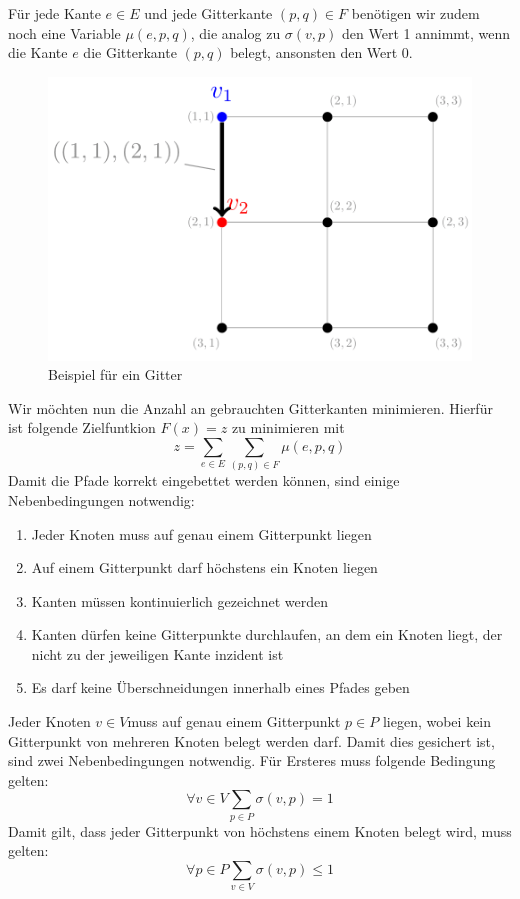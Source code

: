 \documentclass[bachelor, german]{algothesis}
\begin{document}
Für jede Kante $e \in E$ und jede Gitterkante $(p,q) \in F$ benötigen wir zudem noch eine Variable $\mu(e,p,q)$, die analog zu $\sigma(v,p)$ den Wert 1 annimmt, wenn die Kante $e$ die Gitterkante $(p,q)$ belegt, ansonsten den Wert 0.\newline
\begin{figure}[H]
    \centering
    \includegraphics{figures/Variabelsetzung.png}
    \caption{Beispiel für ein Gitter}
    \label{fig:Var_Example}
\end{figure}
Wir möchten nun die Anzahl an gebrauchten Gitterkanten minimieren. Hierfür ist folgende Zielfuntkion $F(x) = z$  zu minimieren mit $$z = \sum_{e \in E} \sum_{(p,q) \in F} \mu(e,p,q)$$
Damit die Pfade korrekt eingebettet werden können, sind einige Nebenbedingungen notwendig:
\begin{enumerate}[(1)]
    \item Jeder Knoten muss auf genau einem Gitterpunkt liegen
    \item Auf einem Gitterpunkt darf höchstens ein Knoten liegen
    \item Kanten müssen kontinuierlich gezeichnet werden
    \item Kanten dürfen keine Gitterpunkte durchlaufen, an dem ein Knoten liegt, der nicht zu der jeweiligen Kante inzident ist
    \item Es darf keine Überschneidungen innerhalb eines Pfades geben
\end{enumerate}
Jeder Knoten $v \in V$muss auf genau einem Gitterpunkt $p \in P$ liegen, wobei kein Gitterpunkt von mehreren Knoten belegt werden darf. Damit dies gesichert ist, sind zwei Nebenbedingungen notwendig. Für Ersteres muss folgende Bedingung gelten: $$ \forall v \in V \sum_{p \in P} \sigma(v,p) = 1$$ Damit gilt, dass jeder Gitterpunkt von höchstens einem Knoten belegt wird, muss gelten: $$\forall p \in P \sum_{v \in V} \sigma(v,p) \leq 1$$ 
\end{document}
